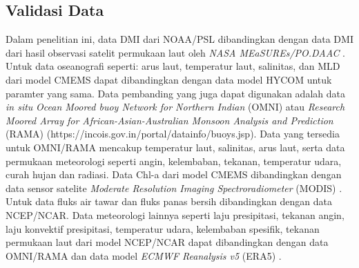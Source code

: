 \begin{spacing}{1.5}
	\subsection[Validasi Data]{Validasi Data}
	Dalam penelitian ini, data DMI dari NOAA/PSL dibandingkan dengan data DMI dari hasil observasi satelit permukaan laut oleh \textit{NASA MEaSUREs/PO.DAAC} \cite{kumar202020th}. Untuk data oseanografi seperti: arus laut, temperatur laut, salinitas, dan MLD dari model CMEMS dapat dibandingkan dengan data model HYCOM untuk paramter yang sama. Data pembanding yang juga dapat digunakan adalah data \textit{in situ} \textit{Ocean Moored buoy Network for Northern Indian} (OMNI) atau \textit{Research Moored Array for African-Asian-Australian Monsoon Analysis and Prediction} (RAMA) (https://incois.gov.in/portal/datainfo/buoys.jsp). Data yang tersedia untuk OMNI/RAMA mencakup temperatur laut, salinitas, arus laut, serta data permukaan meteorologi seperti angin, kelembaban, tekanan, temperatur udara, curah hujan dan radiasi. Data Chl-a dari model CMEMS dibandingkan dengan data sensor satelite \textit{Moderate Resolution Imaging Spectroradiometer} (MODIS) \cite{pagano1993moderate}. Untuk data fluks air tawar dan fluks panas bersih dibandingkan dengan data NCEP/NCAR. Data meteorologi lainnya seperti laju presipitasi, tekanan angin, laju konvektif presipitasi, temperatur udara, kelembaban spesifik, tekanan permukaan laut dari model NCEP/NCAR dapat dibandingkan dengan data OMNI/RAMA dan data model \textit{ECMWF Reanalysis v5} (ERA5) \cite{hersbach2020era5}.
	
	

\end{spacing}
